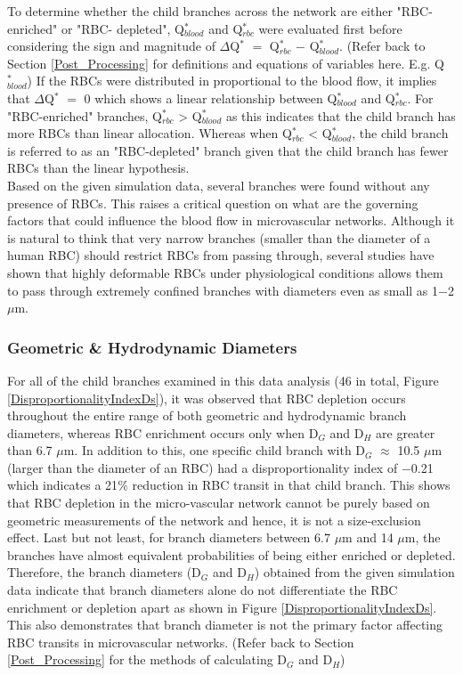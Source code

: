 \noindent To determine whether the child branches across the network are either "RBC-enriched" or "RBC- depleted", Q$^{*}_{blood}$ and Q$^{*}_{rbc}$ were evaluated first before considering the sign and magnitude of $\Delta$Q$^{*}$ $=$ Q$^{*}_{rbc}$ $-$ Q$^{*}_{blood}$. (Refer back to Section \ref{Post_Processing} for definitions and equations of variables here. E.g. Q$^{*}_{blood}$) If the RBCs were distributed in proportional to the blood flow, it implies that $\Delta$Q$^{*}$ $=$ 0 which shows a linear relationship between Q$^{*}_{blood}$ and Q$^{*}_{rbc}$. For "RBC-enriched" branches, Q$^{*}_{rbc}$ > Q$^{*}_{blood}$ as this indicates that the child branch has more RBCs than linear allocation. Whereas when Q$^{*}_{rbc}$ < Q$^{*}_{blood}$, the child branch is referred to as an "RBC-depleted" branch given that the child branch has fewer RBCs than the linear hypothesis. \\


\noindent Based on the given simulation data, several branches were found without any presence of RBCs. This raises a critical question on what are the governing factors that could influence the blood flow in microvascular networks. Although it is natural to think that very narrow branches (smaller than the diameter of a human RBC) should restrict RBCs from passing through, several studies\cite{FreundJonathanB2013Tfor, Salehyar2017EffectsOS, LuHuijie2019Biso} have shown that highly deformable RBCs under physiological conditions allows them to pass through extremely confined branches with diameters even as small as 1$-$2 $\mu$m.


\subsubsection{Geometric \& Hydrodynamic Diameters}
\noindent For all of the child branches examined in this data analysis (46 in total, Figure \ref{DisproportionalityIndexDs}), it was observed that RBC depletion occurs throughout the entire range of both geometric and hydrodynamic branch diameters, whereas RBC enrichment occurs only when D$_{G}$ and D$_{H}$ are greater than 6.7 $\mu$m. In addition to this, one specific child branch with D$_{G}$ $\approx$ 10.5 $\mu$m (larger than the diameter of an RBC) had a disproportionality index of $-$0.21 which indicates a 21$\%$ reduction in RBC transit in that child branch. This shows that RBC depletion in the micro-vascular network cannot be purely based on geometric measurements of the network and hence, it is not a size-exclusion effect. Last but not least, for branch diameters between 6.7 $\mu$m and 14 $\mu$m, the branches have almost equivalent probabilities of being either enriched or depleted. Therefore, the branch diameters (D$_{G}$ and D$_{H}$) obtained from the given simulation data indicate that branch diameters alone do not differentiate the RBC enrichment or depletion apart as shown in Figure \ref{DisproportionalityIndexDs}. This also demonstrates that branch diameter is not the primary factor affecting RBC transits in microvascular networks. (Refer back to Section \ref{Post_Processing} for the methods of calculating D$_{G}$ and D$_{H}$)

